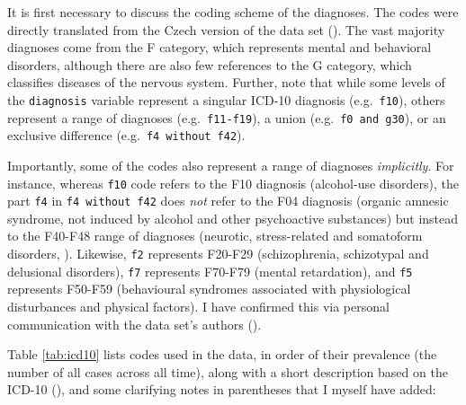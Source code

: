\documentclass[
]{book}
\theoremstyle{definition}
\theoremstyle{definition}
\theoremstyle{definition}
\theoremstyle{definition}
\theoremstyle{remark}
\begin{document}
It is first necessary to discuss the coding scheme of the diagnoses. The codes were directly translated from the Czech version of the data set (). The vast majority diagnoses come from the F category, which represents mental and behavioral disorders, although there are also few references to the G category, which classifies diseases of the nervous system. Further, note that while some levels of the \texttt{diagnosis} variable represent a singular ICD-10 diagnosis (e.g.~\texttt{f10}), others represent a range of diagnoses (e.g.~\texttt{f11-f19}), a union (e.g.~\texttt{f0\ and\ g30}), or an exclusive difference (e.g.~\texttt{f4\ without\ f42}).

Importantly, some of the codes also represent a range of diagnoses \emph{implicitly}. For instance, whereas \texttt{f10} code refers to the F10 diagnosis (alcohol-use disorders), the part \texttt{f4} in \texttt{f4\ without\ f42} does \emph{not} refer to the F04 diagnosis (organic amnesic syndrome, not induced by alcohol and other psychoactive substances) but instead to the F40-F48 range of diagnoses (neurotic, stress-related and somatoform disorders, ). Likewise, \texttt{f2} represents F20-F29 (schizophrenia, schizotypal and delusional disorders), \texttt{f7} represents F70-F79 (mental retardation), and \texttt{f5} represents F50-F59 (behavioural syndromes associated with physiological disturbances and physical factors). I have confirmed this via personal communication with the data set's authors ().

Table \ref{tab:icd10} lists codes used in the data, in order of their prevalence (the number of all cases across all time), along with a short description based on the ICD-10 (), and some clarifying notes in parentheses that I myself have added:
\end{document}
